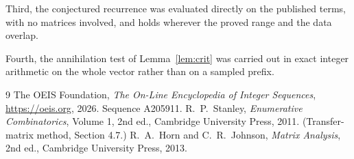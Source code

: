 \documentclass[11pt,a4paper]{article}
\theoremstyle{plain}
\theoremstyle{definition}
\begin{document}
Third, the conjectured recurrence was evaluated directly on the published terms, with no
matrices involved, and holds wherever the proved range and the data overlap.

Fourth, the annihilation test of Lemma~\ref{lem:crit} was carried out in exact integer
arithmetic on the whole vector rather than on a sampled prefix.

\begin{thebibliography}{9}
 The OEIS Foundation, \emph{The On-Line Encyclopedia of Integer
Sequences}, \url{https://oeis.org}, 2026. Sequence A205911.
 R.~P.~Stanley, \emph{Enumerative Combinatorics}, Volume 1, 2nd ed.,
Cambridge University Press, 2011. (Transfer-matrix method, Section 4.7.)
 R.~A.~Horn and C.~R.~Johnson, \emph{Matrix Analysis}, 2nd ed., Cambridge
University Press, 2013.
\end{thebibliography}
\end{document}
